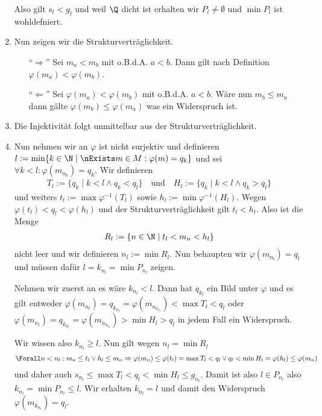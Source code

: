 \begin{solution}
\begin{enumerate}
        Also gilt $s_l < g_l$ und weil $\Q$ dicht ist erhalten wir $P_l \neq \emptyset$ und $\min P_l$ ist wohldefniert.
        \item Nun zeigen wir die Strukturverträglichkeit.
            \begin{enumerate}
                \item [``$\Rightarrow$''] Sei $m_a < m_b$ mit o.B.d.A. $a < b$. Dann gilt nach Definition $\varphi(m_a) < \varphi(m_b)$. 
                \item [``$\Leftarrow$''] Sei $\varphi(m_a) < \varphi(m_b)$ mit o.B.d.A. $a < b$. Wäre nun $m_b \leq m_a$ dann gälte $\varphi(m_b) \leq \varphi(m_a)$ was ein Widerspruch ist. 
            \end{enumerate}
        \item Die Injektivität folgt unmittelbar aus der Strukturverträglichkeit. 
        \item Nun nehmen wir an $\varphi$ ist nicht surjektiv und definieren $l := \min \{k \in \N \mid \nExists m \in M : \varphi(m) = q_k \}$ und sei $\forall k < l: \varphi(m_{n_k}) = q_k$. Wir definieren 
        \begin{align*}
            T_l := \{q_k \mid k < l \land q_k < q_l\} \quad \textrm{und} \quad H_l := \{q_k \mid k < l \land q_k > q_l\} 
        \end{align*}
        und weiters $t_l := \max \varphi^{-1}(T_l)$ sowie $h_l := \min \varphi^{-1}(H_l)$. Wegen $\varphi(t_l) < q_l < \varphi(h_l)$ und der Strukturverträglichkeit gilt $t_l < h_l$. Also ist die Menge
        \begin{align*}
            R_l := \{n \in \N \mid t_l < m_n < h_l\}
        \end{align*}
        nicht leer und wir definieren $n_l := \min R_l$. Nun behaupten wir $\varphi(m_{n_l}) = q_l$ und müssen dafür $l = k_{n_l} = \min P_{n_l}$ zeigen. 

        Nehmen wir zuerst an es wäre $k_{n_l} < l$. Dann hat $q_{k_l}$ ein Bild unter $\varphi$ und es gilt entweder $\varphi(m_{n_l}) = q_{k_{n_l}} = \varphi(m_{n_{k_{n_l}}}) < \max T_l < q_l$ oder $\varphi(m_{n_l}) = q_{k_{n_l}} = \varphi(m_{n_{k_{n_l}}}) > \min H_l > q_l$ in jedem Fall ein Widerspruch. 

        Wir wissen also $k_{n_l} \geq l$. Nun gilt wegen $n_l = \min R_l$
        \begin{align*}
            \Forall n < n_l: m_n \leq t_l \lor h_l \leq m_n \Rightarrow \varphi(m_n) \leq \varphi(t_l) = \max T_l < q_l  \lor q_l < \min H_l = \varphi(h_l) \leq \varphi(m_n)
        \end{align*}
        und daher auch $s_{n_l} \leq \max T_l < q_l < \min H_l \leq g_{n_l}$. Damit ist also $l \in P_{n_l}$ also $k_{n_l} = \min P_{n_l} \leq l$. Wir erhalten $k_{n_l} = l$ und damit den Widerspruch $\varphi(m_{k_{n_l}}) = q_l$. 
    \end{enumerate} 
\end{solution}